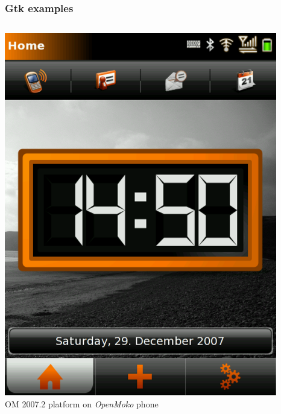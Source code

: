 \begin{frame}
  \frametitle{Gtk examples}
  \begin{columns}
    \includegraphics[width=\textwidth]{slides/sysdev-embedded-linux/openmoko-gui.png}\\
    OM 2007.2 platform on {\em OpenMoko} phone

\end{columns}
\end{frame}

